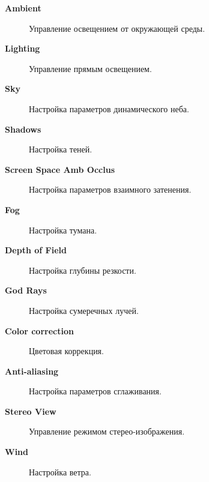 \documentclass[a4paper,12pt,oneside]{sphinxmanual}
\begin{document}
\begin{description}
\item[{\textbf{Ambient}}] \leavevmode
Управление освещением от окружающей среды.

\item[{\textbf{Lighting}}] \leavevmode
Управление прямым освещением.

\item[{\textbf{Sky}}] \leavevmode
Настройка параметров динамического неба.

\item[{\textbf{Shadows}}] \leavevmode
Настройка теней.

\item[{\textbf{Screen Space Amb Occlus}}] \leavevmode
Настройка параметров взаимного затенения.

\item[{\textbf{Fog}}] \leavevmode
Настройка тумана.

\item[{\textbf{Depth of Field}}] \leavevmode
Настройка глубины резкости.

\item[{\textbf{God Rays}}] \leavevmode
Настройка сумеречных лучей.

\item[{\textbf{Color correction}}] \leavevmode
Цветовая коррекция.

\item[{\textbf{Anti-aliasing}}] \leavevmode
Настройка параметров сглаживания.

\item[{\textbf{Stereo View}}] \leavevmode
Управление режимом стерео-изображения.

\item[{\textbf{Wind}}] \leavevmode
Настройка ветра.

\end{description}
\end{document}
